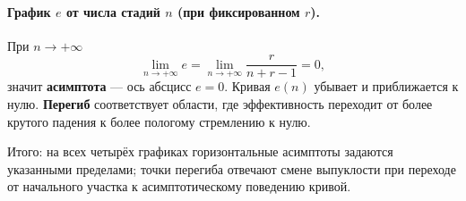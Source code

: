 \paragraph{График $e$ от числа стадий $n$ (при фиксированном $r$).}
При $n \to +\infty$
\[
\lim_{n \to +\infty} e = \lim_{n \to +\infty} \frac{r}{n + r - 1} = 0,
\]
значит \textbf{асимптота} --- ось абсцисс $e = 0$. Кривая $e(n)$ убывает и приближается к нулю. \textbf{Перегиб} соответствует области, где эффективность переходит от более крутого падения к более пологому стремлению к нулю.

Итого: на всех четырёх графиках горизонтальные асимптоты задаются указанными пределами; точки перегиба отвечают смене выпуклости при переходе от начального участка к асимптотическому поведению кривой.
